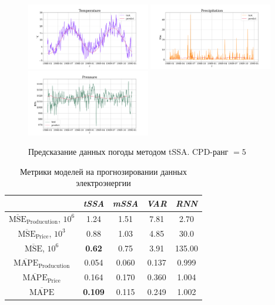 	\begin{figure}[h]
		\centering
		\includegraphics[width=0.48\textwidth, keepaspectratio]{../../experiments/weather/tssa/figs/prediction/cpd_rank_5/Temperature.png}
		\includegraphics[width=0.48\textwidth, keepaspectratio]{../../experiments/weather/tssa/figs/prediction/cpd_rank_5/Precipitation.png}
		\includegraphics[width=0.48\textwidth, keepaspectratio]{../../experiments/weather/tssa/figs/prediction/cpd_rank_5/Pressure.png}
		\caption{Предсказание данных погоды методом tSSA. CPD-ранг $ = 5 $}\label{fig:tssa_weather_pred}
	\end{figure}
	
	\def\arraystretch{1.1}
	\begin{table}[h]
		\centering
		\caption{Метрики моделей на прогнозировании данных электроэнергии}\label{tab:pred_res_electr}
		\begin{tabular}{|c|c|c|c|c|}
			\hline
			& \textit{tSSA}  & \textit{mSSA} & \textit{VAR} & \textit{RNN} \\ \hline
			$ \overline{\text{MSE}}_{\text{Producution}} $, $10^6$ & 1.24           & 1.51          & 7.81         & 2.70         \\ \hline
			$ \overline{\text{MSE}}_{\text{Price}} $, $10^3$      & 0.88           & 1.03          & 4.85         & 30.0         \\ \hline
			$ \overline{\text{MSE}} $, $10^6$             & \textbf{0.62}  & 0.75          & 3.91         & 135.00       \\ \hline
			$ \overline{\text{MAPE}}_{\text{Producution}} $        & 0.054          & 0.060         & 0.137        & 0.999        \\ \hline
			$ \overline{\text{MAPE}}_{\text{Price}} $             & 0.164          & 0.170         & 0.360        & 1.004        \\ \hline
			$ \overline{\text{MAPE}} $                    & \textbf{0.109} & 0.115         & 0.249        & 1.002        \\ \hline
		\end{tabular}
	\end{table}
	
